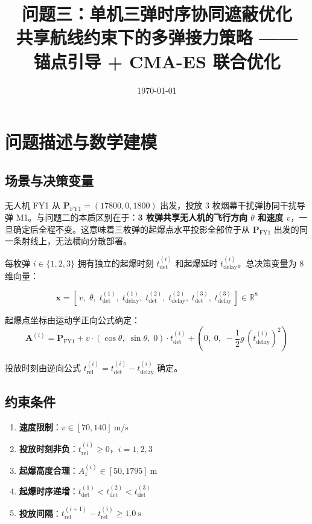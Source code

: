 \documentclass[12pt,a4paper]{ctexart}
\title{\textbf{问题三：单机三弹时序协同遮蔽优化}\\[5pt]
       \large 共享航线约束下的多弹接力策略 —— 锚点引导 + CMA-ES 联合优化}
\author{}
\date{\today}
\newcommand{\tdet}{t_{\text{det}}}
\newcommand{\R}{\mathbb{R}}
\begin{document}
\maketitle

\section{问题描述与数学建模}

\subsection{场景与决策变量}

无人机 FY1 从 $\mathbf{P}_{\text{FY1}} = (17800, 0, 1800)$ 出发，投放 3 枚烟幕干扰弹协同干扰导弹 M1。与问题二的本质区别在于：\textbf{3 枚弹共享无人机的飞行方向 $\theta$ 和速度 $v$}，一旦确定后全程不变。这意味着三枚弹的起爆点水平投影全部位于从 $\mathbf{P}_{\text{FY1}}$ 出发的同一条射线上，无法横向分散部署。

每枚弹 $i \in \{1,2,3\}$ 拥有独立的起爆时刻 $\tdet^{(i)}$ 和起爆延时 $t_{\text{delay}}^{(i)}$。总决策变量为 8 维向量：

\begin{equation}
\boxed{\mathbf{x} = \left[\,v,\; \theta,\; \tdet^{(1)},\; t_{\text{delay}}^{(1)},\; \tdet^{(2)},\; t_{\text{delay}}^{(2)},\; \tdet^{(3)},\; t_{\text{delay}}^{(3)}\,\right] \in \R^8}
\end{equation}

起爆点坐标由运动学正向公式确定：
\begin{equation}
\mathbf{A}^{(i)} = \mathbf{P}_{\text{FY1}} + v \cdot (\cos\theta,\; \sin\theta,\; 0) \cdot \tdet^{(i)} + \left(0,\; 0,\; -\frac{1}{2}g\,(t_{\text{delay}}^{(i)})^2\right)
\end{equation}

投放时刻由逆向公式 $t_{\text{rel}}^{(i)} = \tdet^{(i)} - t_{\text{delay}}^{(i)}$ 确定。

\subsection{约束条件}

\begin{enumerate}[label=(C\arabic*), leftmargin=*]
    \item \textbf{速度限制}：$v \in [70, 140]\ \mathrm{m/s}$
    \item \textbf{投放时刻非负}：$t_{\text{rel}}^{(i)} \geq 0$，$i = 1,2,3$
    \item \textbf{起爆高度合理}：$A_z^{(i)} \in [50, 1795]\ \mathrm{m}$
    \item \textbf{起爆时序递增}：$\tdet^{(1)} < \tdet^{(2)} < \tdet^{(3)}$
    \item \textbf{投放间隔}：$t_{\text{rel}}^{(i+1)} - t_{\text{rel}}^{(i)} \geq 1.0\ \mathrm{s}$
\end{enumerate}
\end{document}
